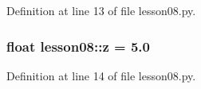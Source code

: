 Definition at line 13 of file lesson08.py.
\subsubsection{\setlength{\rightskip}{0pt plus 5cm}float {\bf lesson08::z} = 5.0\hspace{0.3cm}{\tt  [static]}}\label{namespacelesson08_bc96a85950e1bd8e2192ad53aae02f3f}




Definition at line 14 of file lesson08.py.